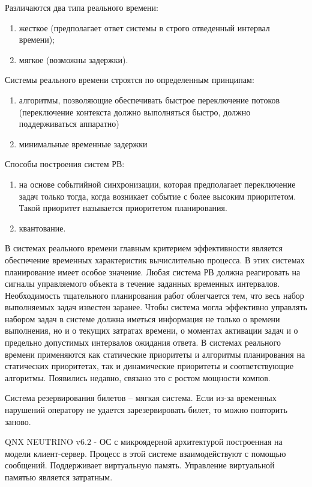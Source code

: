Различаются два типа реального времени:
\begin{enumerate}
    \item жесткое (предполагает ответ системы в строго отведенный интервал времени);
    \item мягкое (возможны задержки).
\end{enumerate} 

Системы реального времени строятся по определенным принципам:
\begin{enumerate}
    \item алгоритмы, позволяющие обеспечивать быстрое переключение потоков (переключение контекста должно выполняться быстро, должно поддерживаться аппаратно) 
    \item минимальные временные задержки
\end{enumerate} 

Способы построения систем РВ:
\begin{enumerate}
    \item на основе событийной синхронизации, которая предполагает переключение задач только тогда, когда возникает событие с более высоким приоритетом. Такой приоритет называется приоритетом планирования.
    \item квантование.
\end{enumerate} 

В системах реального времени главным критерием эффективности является обеспечение временных характеристик вычислительно процесса. В этих системах планирование имеет особое значение. Любая система РВ должна реагировать на сигналы управляемого объекта в течение заданных временных интервалов. Необходимость тщательного планирования работ облегчается тем, что весь набор выполняемых задач известен заранее. Чтобы система могла эффективно управлять набором задач в системе должна иметься информация не только о времени выполнения, но и о текущих затратах времени, о моментах активации задач и о предельно допустимых интервалов ожидания ответа. В системах реального времени применяются как статические приоритеты и алгоритмы планирования на статических приоритетах, так и динамические приоритеты и соответствующие алгоритмы. Появились недавно, связано это с ростом мощности компов. 

Система резервирования билетов – мягкая система. Если из-за временных нарушений оператору не удается зарезервировать билет, то можно повторить заново. 

QNX NEUTRINO v6.2 - ОС с микроядерной архитектурой построенная на модели клиент-сервер. Процесс в этой системе взаимодействуют с помощью сообщений. Поддерживает виртуальную память. Управление виртуальной памятью является затратным.

